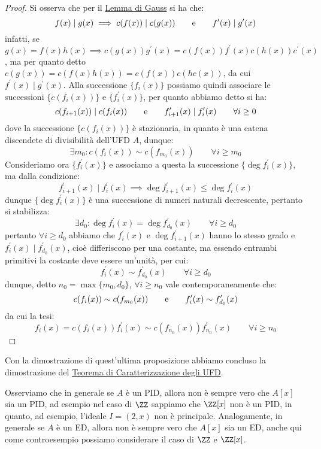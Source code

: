 \documentclass[11pt]{scrartcl}
\begin{document}
\begin{proof}
    Si osserva che per il \hyperref[gauss]{Lemma di Gauss} si ha che:
    \[ f(x) \mid g(x) \implies c(f(x)) \mid c(g(x)) \qquad \text e \qquad f^{\prime}(x) \mid g^{\prime}(x)
        \]
    infatti, se $g(x) = f(x) h(x) \implies c(g(x))g^{\prime}(x) = c(f(x))f^{\prime}(x)c(h(x))c^{\prime}(x)$,
    ma per quanto detto $c(g(x)) = c(f(x)h(x)) = c(f(x))c(hc(x))$, da cui $f^{\prime}(x) \mid g^{\prime}(x)$.
    Alla successione $\{f_i(x)\}$ possiamo quindi associare le successioni $\{c(f_i(x))\}$ e $\{f_i^{\prime}(x)\}$, per quanto abbiamo detto si ha:
    \[ c(f_{i+1}(x)) \mid c(f_{i}(x)) \qquad \text e \qquad f_{i+1}^{\prime}(x) \mid f_i^{\prime}(x) \qquad \forall i \geq 0
        \]
    dove la successione $\{c(f_i(x))\}$ è stazionaria, in quanto è una catena discendete di divisibilità dell'UFD $A$, dunque:
    \[ \exists m_0 : c(f_i(x)) \sim c(f_{m_0}(x)) \qquad \forall i \geq m_0
        \]
    Consideriamo ora $\{f_i^{\prime}(x)\}$ e associamo a questa la successione $\{\deg f_i^{\prime}(x)\}$, ma dalla condizione:
    \[ f_{i+1}^{\prime}(x) \mid f_i^{\prime}(x) \implies \deg f_{i+1}^{\prime}(x) \leq \deg f_i^{\prime}(x)
        \]
    dunque $\{\deg f_i^{\prime}(x)\}$ è una successione di numeri naturali decrescente, pertanto si stabilizza:
    \[ \exists d_0 : \deg f_{i}^{\prime}(x) = \deg f_{d_0}^{\prime}(x) \qquad \forall i \geq d_0
        \]
    pertanto $\forall i \geq d_0$ abbiamo che $f_i^{\prime}(x)$ e $\deg f_{i+1}^{\prime}(x)$ hanno lo stesso grado e $f_{i}^{\prime}(x) \mid f_{d_0}^{\prime}(x)$,
    cioè differiscono per una costante, ma essendo entrambi primitivi la costante deve essere un'unità, per cui:
    \[ f_{i}^{\prime}(x) \sim f_{d_0}^{\prime}(x) \qquad \forall i \geq d_0
        \]
    dunque, detto $n_0 = \max\{m_0,d_0\}$, $\forall i \geq n_0$ vale contemporaneamente che:
    \[ c(f_i(x)) \sim c(f_{m_0}(x)) \qquad \text e \qquad f_{i}^{\prime}(x) \sim f_{d_0}^{\prime}(x)
        \]
    da cui la tesi:
    \[ f_i(x) = c(f_i(x))f_{i}^{\prime}(x) \sim c(f_{n_0}(x))f_{n_0}^{\prime}(x) \qquad \forall i \geq n_0
        \]
\end{proof}

Con la dimostrazione di quest'ultima proposizione abbiamo concluso la dimostrazione del \hyperref[2.109]{Teorema di Caratterizzazione degli UFD}.

\begin{remark}
    Osserviamo che in generale se $A$ è un PID, allora non è sempre vero che $A[x]$ sia un PID, ad esempio nel caso di $\ZZ$ sappiamo che $\ZZ[x]$ non è un PID, in quanto,
    ad esempio, l'ideale $I = (2,x)$ non è principale. Analogamente, in generale se $A$ è un ED, allora non è sempre vero che $A[x]$ sia un ED, anche qui come controesempio possiamo 
    considerare il caso di $\ZZ$ e $\ZZ[x]$.
\end{remark}
\end{document}
